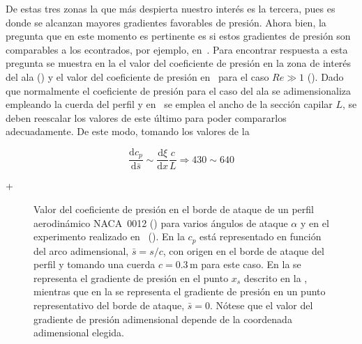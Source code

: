 De estas tres zonas la que más despierta nuestro interés es la tercera, pues es donde se alcanzan mayores gradientes favorables de presión. Ahora bien, la pregunta que en este momento es pertinente es si estos gradientes de presión son comparables a los econtrados, por ejemplo, en~\cite{Evangelio2015b}. Para encontrar respuesta a esta pregunta se muestra en la  el valor del coeficiente de presión en la zona de interés del ala () y el valor del coeficiente de presión en~\cite{Evangelio2015b} para el caso $Re \gg 1$ (). Dado que normalmente el coeficiente de presión para el caso del ala se adimensionaliza empleando la cuerda del perfil y en~\cite{Evangelio2015b} se emplea el ancho de la sección capilar $L$, se deben reescalar los valores de este último para poder compararlos adecuadamente. De este modo, tomando los valores de la 

\begin{equation}
\dfrac{\mathrm{d}c_{p}}{\mathrm{d}\bar{s}} \sim \dfrac{\mathrm{d}\xi}{\mathrm{d}x}\dfrac{c}{L} \Rightarrow 430 \sim 640
\end{equation}

+\begin{figure}
\centering
{}
\caption{Valor del coeficiente de presión en el borde de ataque de un perfil aerodinámico NACA~0012 () para varios ángulos de ataque $\alpha$  y en el experimento realizado en~\cite{Evangelio2015b} (). En la  $c_{p}$ está representado en función del arco adimensional, $\bar{s} = s/c$, con origen en el borde de ataque del perfil y tomando una cuerda $c = 0.3\,\mathrm{m}$ para este caso. En la  se representa el gradiente de presión en el punto $x_{s}$ descrito en la , mientras que en la se representa el gradiente de presión en un punto representativo del borde de ataque, $\bar{s}=0$. Nótese que el valor del gradiente de presión adimensional depende de la coordenada adimensional elegida.} 
\end{figure}


